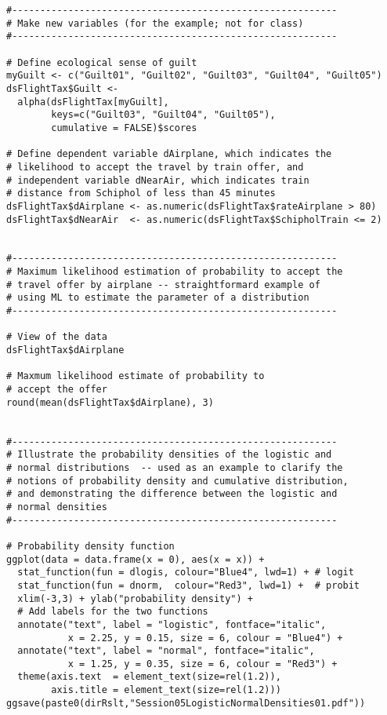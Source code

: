 \documentclass{article}
\begin{document}
\begin{tiny}
\begin{verbatim}
#----------------------------------------------------------
# Make new variables (for the example; not for class)
#----------------------------------------------------------

# Define ecological sense of guilt
myGuilt <- c("Guilt01", "Guilt02", "Guilt03", "Guilt04", "Guilt05")
dsFlightTax$Guilt <- 
  alpha(dsFlightTax[myGuilt],
        keys=c("Guilt03", "Guilt04", "Guilt05"), 
        cumulative = FALSE)$scores

# Define dependent variable dAirplane, which indicates the 
# likelihood to accept the travel by train offer, and
# independent variable dNearAir, which indicates train
# distance from Schiphol of less than 45 minutes
dsFlightTax$dAirplane <- as.numeric(dsFlightTax$rateAirplane > 80)
dsFlightTax$dNearAir  <- as.numeric(dsFlightTax$SchipholTrain <= 2)


#----------------------------------------------------------
# Maximum likelihood estimation of probability to accept the
# travel offer by airplane -- straightformard example of 
# using ML to estimate the parameter of a distribution
#----------------------------------------------------------

# View of the data
dsFlightTax$dAirplane

# Maxmum likelihood estimate of probability to
# accept the offer
round(mean(dsFlightTax$dAirplane), 3)


#----------------------------------------------------------
# Illustrate the probability densities of the logistic and 
# normal distributions  -- used as an example to clarify the
# notions of probability density and cumulative distribution,
# and demonstrating the difference between the logistic and 
# normal densities
#----------------------------------------------------------

# Probability density function
ggplot(data = data.frame(x = 0), aes(x = x)) +
  stat_function(fun = dlogis, colour="Blue4", lwd=1) + # logit
  stat_function(fun = dnorm,  colour="Red3", lwd=1) +  # probit
  xlim(-3,3) + ylab("probability density") +
  # Add labels for the two functions
  annotate("text", label = "logistic", fontface="italic", 
           x = 2.25, y = 0.15, size = 6, colour = "Blue4") +
  annotate("text", label = "normal", fontface="italic", 
           x = 1.25, y = 0.35, size = 6, colour = "Red3") +
  theme(axis.text  = element_text(size=rel(1.2)),
        axis.title = element_text(size=rel(1.2)))
ggsave(paste0(dirRslt,"Session05LogisticNormalDensities01.pdf"))  


\end{verbatim}
\end{tiny}
\end{document}
